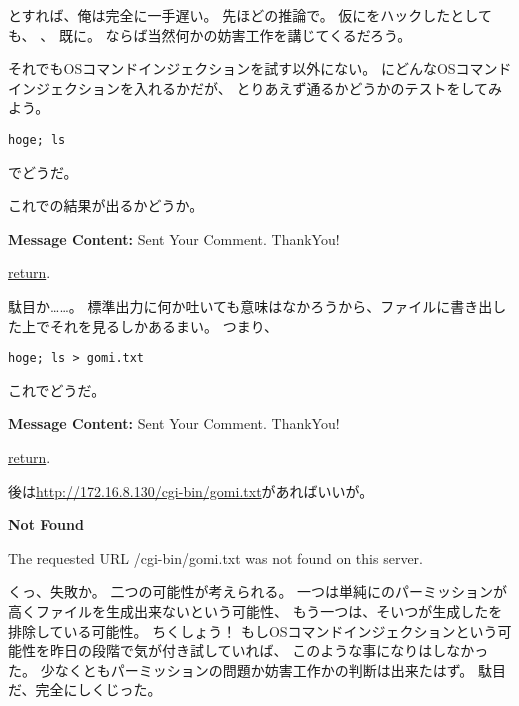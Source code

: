 とすれば、俺は完全に一手遅い。
先ほどの推論で。
仮にをハックしたとしても、
、
既に。
ならば当然何かの妨害工作を講じてくるだろう。

それでもOSコマンドインジェクションを試す以外にない。
にどんなOSコマンドインジェクションを入れるかだが、
とりあえず通るかどうかのテストをしてみよう。

\begin{lstlisting}
hoge; ls
\end{lstlisting}

でどうだ。

これでの結果が出るかどうか。

\begin{itembox}[c]{\textbf{Message Content:}}
Sent Your Comment. ThankYou!

\underline{return}. 
\end{itembox}

駄目か……。
標準出力に何か吐いても意味はなかろうから、ファイルに書き出した上でそれを見るしかあるまい。
つまり、

\begin{lstlisting}
hoge; ls > gomi.txt
\end{lstlisting}

これでどうだ。

\begin{itembox}[c]{\textbf{Message Content:}}
Sent Your Comment. ThankYou!

\underline{return}. 
\end{itembox}

後は\url{http://172.16.8.130/cgi-bin/gomi.txt}があればいいが。

\begin{itembox}[c]{\textbf{Not Found}}

The requested URL /cgi-bin/gomi.txt was not found on this server.
\end{itembox}

くっ、失敗か。
二つの可能性が考えられる。
一つは単純にのパーミッションが高くファイルを生成出来ないという可能性、
もう一つは、そいつが生成したを排除している可能性。
ちくしょう！
もしOSコマンドインジェクションという可能性を昨日の段階で気が付き試していれば、
このような事になりはしなかった。
少なくともパーミッションの問題か妨害工作かの判断は出来たはず。
駄目だ、完全にしくじった。

